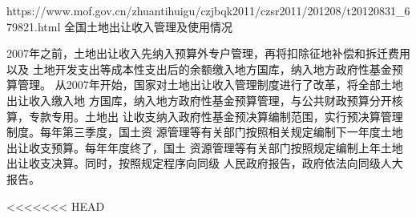 https://www.mof.gov.cn/zhuantihuigu/czjbqk2011/czsr2011/201208/t20120831_679821.html
全国土地出让收入管理及使用情况

2007年之前，土地出让收入先纳入预算外专户管理，再将扣除征地补偿和拆迁费用以及
土地开发支出等成本性支出后的余额缴入地方国库，纳入地方政府性基金预算管理。
从2007年开始，国家对土地出让收入管理制度进行了改革，将全部土地出让收入缴入地
方国库，纳入地方政府性基金预算管理，与公共财政预算分开核算，专款专用。土地出
让收支纳入政府性基金预决算编制范围，实行预决算管理制度。每年第三季度，国土资
源管理等有关部门按照相关规定编制下一年度土地出让收支预算。每年年度终了，国土
资源管理等有关部门按照规定编制上年土地出让收支决算。同时，按照规定程序向同级
人民政府报告，政府依法向同级人大报告。

<<<<<<< HEAD





